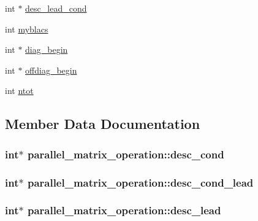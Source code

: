 \begin{DoxyCompactItemize}
int $\ast$ \hyperlink{structparallel__matrix__operation_aeb3df130dec873564b1384c62df055a1}{desc\-\_\-lead\-\_\-cond}
\item 
int \hyperlink{structparallel__matrix__operation_acc1bb23b74edc660f9d844be508d3fdb}{myblacs}
\item 
int $\ast$ \hyperlink{structparallel__matrix__operation_a058d611c4789629bfd869734a2ae0de7}{diag\-\_\-begin}
\item 
int $\ast$ \hyperlink{structparallel__matrix__operation_a60cfcc0519573d48bd9f7b981bddc638}{offdiag\-\_\-begin}
\item 
int \hyperlink{structparallel__matrix__operation_a3a43c20339897f4c83ccfa2f7d0f1807}{ntot}
\end{DoxyCompactItemize}


\subsection{Member Data Documentation}
\hypertarget{structparallel__matrix__operation_a3863e4fc074a4b974e7fdbb363bf783a}{
\subsubsection[{desc\-\_\-cond}]{\setlength{\rightskip}{0pt plus 5cm}int$\ast$ parallel\-\_\-matrix\-\_\-operation\-::desc\-\_\-cond}}\label{structparallel__matrix__operation_a3863e4fc074a4b974e7fdbb363bf783a}
\hypertarget{structparallel__matrix__operation_a128bd398cde34666dc68235115edd6a3}{
\subsubsection[{desc\-\_\-cond\-\_\-lead}]{\setlength{\rightskip}{0pt plus 5cm}int$\ast$ parallel\-\_\-matrix\-\_\-operation\-::desc\-\_\-cond\-\_\-lead}}\label{structparallel__matrix__operation_a128bd398cde34666dc68235115edd6a3}
\hypertarget{structparallel__matrix__operation_a44eb7f984f2feb6d103982435c05488e}{
\subsubsection[{desc\-\_\-lead}]{\setlength{\rightskip}{0pt plus 5cm}int$\ast$ parallel\-\_\-matrix\-\_\-operation\-::desc\-\_\-lead}}\label{structparallel__matrix__operation_a44eb7f984f2feb6d103982435c05488e}
